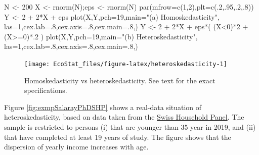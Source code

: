 \documentclass[
  12pt,
]{book}
\newenvironment{Shaded}{\begin{snugshade}}{\end{snugshade}}
\newcommand{\AttributeTok}[1]{\textcolor[rgb]{0.77,0.63,0.00}{#1}}
\newcommand{\DecValTok}[1]{\textcolor[rgb]{0.00,0.00,0.81}{#1}}
\newcommand{\FunctionTok}[1]{\textcolor[rgb]{0.00,0.00,0.00}{#1}}
\newcommand{\NormalTok}[1]{#1}
\newcommand{\OtherTok}[1]{\textcolor[rgb]{0.56,0.35,0.01}{#1}}
\newcommand{\SpecialCharTok}[1]{\textcolor[rgb]{0.00,0.00,0.00}{#1}}
\newcommand{\StringTok}[1]{\textcolor[rgb]{0.31,0.60,0.02}{#1}}
\theoremstyle{definition}
\theoremstyle{definition}
\theoremstyle{definition}
\theoremstyle{definition}
\theoremstyle{remark}
\begin{document}
\begin{Shaded}
\begin{Highlighting}[]
\NormalTok{N }\OtherTok{\textless{}{-}} \DecValTok{200}
\NormalTok{X }\OtherTok{\textless{}{-}} \FunctionTok{rnorm}\NormalTok{(N);eps }\OtherTok{\textless{}{-}} \FunctionTok{rnorm}\NormalTok{(N)}
\FunctionTok{par}\NormalTok{(}\AttributeTok{mfrow=}\FunctionTok{c}\NormalTok{(}\DecValTok{1}\NormalTok{,}\DecValTok{2}\NormalTok{),}\AttributeTok{plt=}\FunctionTok{c}\NormalTok{(.}\DecValTok{2}\NormalTok{,.}\DecValTok{95}\NormalTok{,.}\DecValTok{2}\NormalTok{,.}\DecValTok{8}\NormalTok{))}
\NormalTok{Y }\OtherTok{\textless{}{-}} \DecValTok{2} \SpecialCharTok{+} \DecValTok{2}\SpecialCharTok{*}\NormalTok{X }\SpecialCharTok{+}\NormalTok{ eps}
\FunctionTok{plot}\NormalTok{(X,Y,}\AttributeTok{pch=}\DecValTok{19}\NormalTok{,}\AttributeTok{main=}\StringTok{"(a) Homoskedasticity"}\NormalTok{,}
     \AttributeTok{las=}\DecValTok{1}\NormalTok{,}\AttributeTok{cex.lab=}\NormalTok{.}\DecValTok{8}\NormalTok{,}\AttributeTok{cex.axis=}\NormalTok{.}\DecValTok{8}\NormalTok{,}\AttributeTok{cex.main=}\NormalTok{.}\DecValTok{8}\NormalTok{,)}
\NormalTok{Y }\OtherTok{\textless{}{-}} \DecValTok{2} \SpecialCharTok{+} \DecValTok{2}\SpecialCharTok{*}\NormalTok{X }\SpecialCharTok{+}\NormalTok{ eps}\SpecialCharTok{*}\NormalTok{( (X}\SpecialCharTok{\textless{}}\DecValTok{0}\NormalTok{)}\SpecialCharTok{*}\DecValTok{2} \SpecialCharTok{+}\NormalTok{ (X}\SpecialCharTok{\textgreater{}=}\DecValTok{0}\NormalTok{)}\SpecialCharTok{*}\NormalTok{.}\DecValTok{2}\NormalTok{ )}
\FunctionTok{plot}\NormalTok{(X,Y,}\AttributeTok{pch=}\DecValTok{19}\NormalTok{,}\AttributeTok{main=}\StringTok{"(b) Heteroskedasticity"}\NormalTok{,}
     \AttributeTok{las=}\DecValTok{1}\NormalTok{,}\AttributeTok{cex.lab=}\NormalTok{.}\DecValTok{8}\NormalTok{,}\AttributeTok{cex.axis=}\NormalTok{.}\DecValTok{8}\NormalTok{,}\AttributeTok{cex.main=}\NormalTok{.}\DecValTok{8}\NormalTok{,)}
\end{Highlighting}
\end{Shaded}

\begin{figure}
\texttt{[image: EcoStat\_files/figure-latex/heteroskedasticity-1]} \caption{Homoskedasticity vs heteroskedasticity. See text for the exact specifications.}\label{fig:heteroskedasticity}
\end{figure}

Figure \ref{fig:exmpSalarayPhDSHP} shows a real-data situation of heteroskedasticity, based on data taken from the \href{https://forscenter.ch/projects/swiss-household-panel/}{Swiss Household Panel}. The sample is restricted to persons (i) that are younger than 35 year in 2019, and (ii) that have completed at least 19 years of study. The figure shows that the dispersion of yearly income increases with age.
\end{document}
